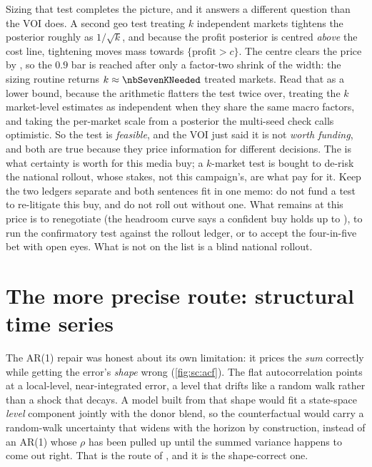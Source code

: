 Sizing that test completes the picture, and it answers a different question than the VOI does. A
second geo test treating $k$ independent markets tightens the posterior roughly as $1/\sqrt{k}$, and
because the profit posterior is centred \emph{above} the cost line, tightening moves mass towards
$\{\text{profit} > c\}$. The centre clears the price by \keur{\nbSevenExpNet}, so the $0.9$ bar is
reached after only a factor-two shrink of the width: the sizing routine returns
$k \approx \nbSevenKNeeded$ treated markets. Read that as a lower bound, because the arithmetic
flatters the test twice over, treating the $k$ market-level estimates as independent when they share
the same macro factors, and taking the per-market scale from a posterior the multi-seed check calls
optimistic. So the test is \emph{feasible}, and the VOI just said it is not \emph{worth funding}, and
both are true because they price information for different decisions. The \keur{\nbSevenVoi} is what
certainty is worth for this \keur{\nbSevenCost} media buy; a $k$-market test is bought to de-risk the
national rollout, whose stakes, not this campaign's, are what pay for it. Keep the two ledgers
separate and both sentences fit in one memo: do not fund a test to re-litigate this buy, and do not
roll out without one. What remains at this price is to renegotiate (the headroom curve says a
confident buy holds up to \keur{\nbSevenHeadroom}), to run the confirmatory test against the rollout
ledger, or to accept the four-in-five bet with open eyes. What is not on the list is a blind national
rollout.

\section{The more precise route: structural time series}
\label{sec:sc:sts}

The AR(1) repair was honest about its own limitation: it prices the \emph{sum} correctly while
getting the error's \emph{shape} wrong (\cref{fig:sc:acf}). The flat autocorrelation points at a
local-level, near-integrated error, a level that drifts like a random walk rather than a shock that
decays. A model built from that shape would fit a state-space \emph{level} component jointly with the
donor blend, so the counterfactual would carry a random-walk uncertainty that widens with the horizon
by construction, instead of an AR(1) whose $\rho$ has been pulled up until the summed variance happens
to come out right. That is the route of \citet{brodersen2015}, and it is the shape-correct one.

